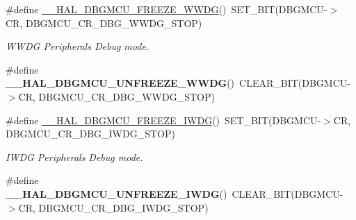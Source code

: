 \begin{DoxyCompactItemize}
\item 
\mbox{\label{group___d_b_g_m_c_u___freeze___unfreeze_ga81215154725c479c67fb1adac906fbd9}} 
\#define \hyperlink{group___d_b_g_m_c_u___freeze___unfreeze_ga81215154725c479c67fb1adac906fbd9}{\+\_\+\+\_\+\+H\+A\+L\+\_\+\+D\+B\+G\+M\+C\+U\+\_\+\+F\+R\+E\+E\+Z\+E\+\_\+\+W\+W\+DG}()~S\+E\+T\+\_\+\+B\+IT(D\+B\+G\+M\+CU-\/$>$CR, D\+B\+G\+M\+C\+U\+\_\+\+C\+R\+\_\+\+D\+B\+G\+\_\+\+W\+W\+D\+G\+\_\+\+S\+T\+OP)
\begin{DoxyCompactList}\small\item\em W\+W\+DG Peripherals Debug mode. \end{DoxyCompactList}\item 
\mbox{\label{group___d_b_g_m_c_u___freeze___unfreeze_gaa14c8a2e8911976b8c8ce6ca278372a2}} 
\#define {\bfseries \+\_\+\+\_\+\+H\+A\+L\+\_\+\+D\+B\+G\+M\+C\+U\+\_\+\+U\+N\+F\+R\+E\+E\+Z\+E\+\_\+\+W\+W\+DG}()~C\+L\+E\+A\+R\+\_\+\+B\+IT(D\+B\+G\+M\+CU-\/$>$CR, D\+B\+G\+M\+C\+U\+\_\+\+C\+R\+\_\+\+D\+B\+G\+\_\+\+W\+W\+D\+G\+\_\+\+S\+T\+OP)
\item 
\mbox{\label{group___d_b_g_m_c_u___freeze___unfreeze_gabab7ab631ba58fb6246a9385e8af9d0d}} 
\#define \hyperlink{group___d_b_g_m_c_u___freeze___unfreeze_gabab7ab631ba58fb6246a9385e8af9d0d}{\+\_\+\+\_\+\+H\+A\+L\+\_\+\+D\+B\+G\+M\+C\+U\+\_\+\+F\+R\+E\+E\+Z\+E\+\_\+\+I\+W\+DG}()~S\+E\+T\+\_\+\+B\+IT(D\+B\+G\+M\+CU-\/$>$CR, D\+B\+G\+M\+C\+U\+\_\+\+C\+R\+\_\+\+D\+B\+G\+\_\+\+I\+W\+D\+G\+\_\+\+S\+T\+OP)
\begin{DoxyCompactList}\small\item\em I\+W\+DG Peripherals Debug mode. \end{DoxyCompactList}\item 
\mbox{\label{group___d_b_g_m_c_u___freeze___unfreeze_gab29a88ef9c31cbe107c58b9ecc3bdf79}} 
\#define {\bfseries \+\_\+\+\_\+\+H\+A\+L\+\_\+\+D\+B\+G\+M\+C\+U\+\_\+\+U\+N\+F\+R\+E\+E\+Z\+E\+\_\+\+I\+W\+DG}()~C\+L\+E\+A\+R\+\_\+\+B\+IT(D\+B\+G\+M\+CU-\/$>$CR, D\+B\+G\+M\+C\+U\+\_\+\+C\+R\+\_\+\+D\+B\+G\+\_\+\+I\+W\+D\+G\+\_\+\+S\+T\+OP)
\item 
\mbox{\label{group___d_b_g_m_c_u___freeze___unfreeze_ga6160f642dcff812be3a04c5b5c66e31d}} 

\end{DoxyCompactItemize}
